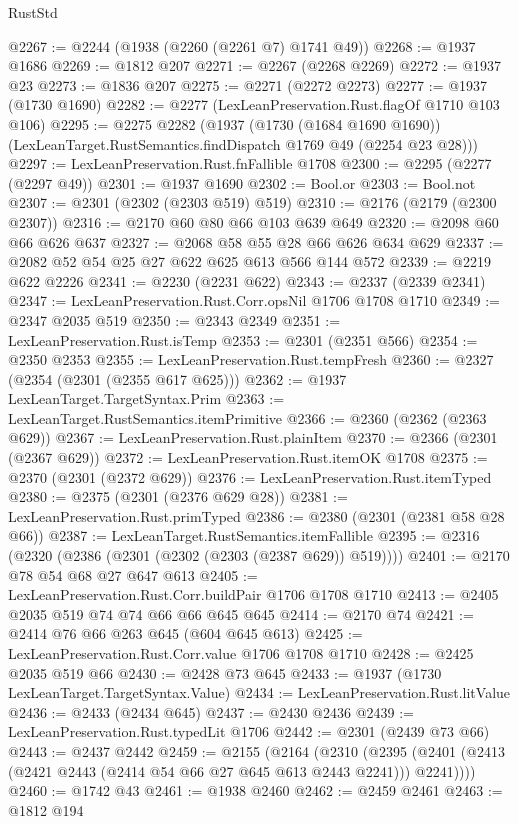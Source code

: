 \begin{lexlean}{RustStd}
\begin{coremodule}
{\begin{coremodule}
{{{{{{{{{{{{{@2267 := @2244 (@1938 (@2260 (@2261 @7) @1741 @49))
@2268 := @1937 @1686
@2269 := @1812 @207
@2271 := @2267 (@2268 @2269)
@2272 := @1937 @23
@2273 := @1836 @207
@2275 := @2271 (@2272 @2273)
@2277 := @1937 (@1730 @1690)
@2282 := @2277 (LexLeanPreservation.Rust.flagOf @1710 @103 @106)
@2295 := @2275
    @2282
    (@1937
      (@1730 (@1684 @1690 @1690))
      (LexLeanTarget.RustSemantics.findDispatch @1769 @49 (@2254 @23 @28)))
@2297 := LexLeanPreservation.Rust.fnFallible @1708
@2300 := @2295 (@2277 (@2297 @49))
@2301 := @1937 @1690
@2302 := Bool.or
@2303 := Bool.not
@2307 := @2301 (@2302 (@2303 @519) @519)
@2310 := @2176 (@2179 (@2300 @2307))
@2316 := @2170 @60 @80 @66 @103 @639 @649
@2320 := @2098 @60 @66 @626 @637
@2327 := @2068 @58 @55 @28 @66 @626 @634 @629
@2337 := @2082 @52 @54 @25 @27 @622 @625 @613 @566 @144 @572
@2339 := @2219 @622 @2226
@2341 := @2230 (@2231 @622)
@2343 := @2337 (@2339 @2341)
@2347 := LexLeanPreservation.Rust.Corr.opsNil @1706 @1708 @1710
@2349 := @2347 @2035 @519
@2350 := @2343 @2349
@2351 := LexLeanPreservation.Rust.isTemp
@2353 := @2301 (@2351 @566)
@2354 := @2350 @2353
@2355 := LexLeanPreservation.Rust.tempFresh
@2360 := @2327 (@2354 (@2301 (@2355 @617 @625)))
@2362 := @1937 LexLeanTarget.TargetSyntax.Prim
@2363 := LexLeanTarget.RustSemantics.itemPrimitive
@2366 := @2360 (@2362 (@2363 @629))
@2367 := LexLeanPreservation.Rust.plainItem
@2370 := @2366 (@2301 (@2367 @629))
@2372 := LexLeanPreservation.Rust.itemOK @1708
@2375 := @2370 (@2301 (@2372 @629))
@2376 := LexLeanPreservation.Rust.itemTyped
@2380 := @2375 (@2301 (@2376 @629 @28))
@2381 := LexLeanPreservation.Rust.primTyped
@2386 := @2380 (@2301 (@2381 @58 @28 @66))
@2387 := LexLeanTarget.RustSemantics.itemFallible
@2395 := @2316 (@2320 (@2386 (@2301 (@2302 (@2303 (@2387 @629)) @519))))
@2401 := @2170 @78 @54 @68 @27 @647 @613
@2405 := LexLeanPreservation.Rust.Corr.buildPair @1706 @1708 @1710
@2413 := @2405 @2035 @519 @74 @74 @66 @66 @645 @645
@2414 := @2170 @74
@2421 := @2414 @76 @66 @263 @645 (@604 @645 @613)
@2425 := LexLeanPreservation.Rust.Corr.value @1706 @1708 @1710
@2428 := @2425 @2035 @519 @66
@2430 := @2428 @73 @645
@2433 := @1937 (@1730 LexLeanTarget.TargetSyntax.Value)
@2434 := LexLeanPreservation.Rust.litValue
@2436 := @2433 (@2434 @645)
@2437 := @2430 @2436
@2439 := LexLeanPreservation.Rust.typedLit @1706
@2442 := @2301 (@2439 @73 @66)
@2443 := @2437 @2442
@2459 := @2155
    (@2164
      (@2310 (@2395 (@2401 (@2413 (@2421 @2443 (@2414 @54 @66 @27 @645 @613 @2443 @2241))) @2241))))
@2460 := @1742 @43
@2461 := @1938 @2460
@2462 := @2459 @2461
@2463 := @1812 @194
}}}}}}}}}}}}}
\end{coremodule}}
\end{coremodule}
\end{lexlean}
